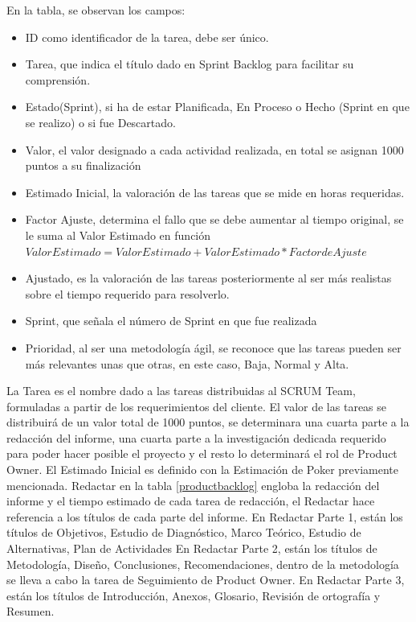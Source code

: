 En la tabla, se observan los campos:
\begin{itemize}
	\item ID como identificador de la tarea, debe ser único.
	\item Tarea, que indica el título dado en Sprint Backlog para facilitar su comprensión.
	\item Estado(Sprint), si ha de estar Planificada, En Proceso o Hecho (Sprint en que se realizo) o si fue Descartado.
	\item Valor, el valor designado a cada actividad realizada, en total se asignan 1000 puntos a su finalización
	\item Estimado Inicial, la valoración de las tareas que se mide en horas requeridas.
	\item Factor Ajuste, determina el fallo que se debe aumentar al tiempo original, se le suma al Valor Estimado en función $Valor Estimado = Valor Estimado + Valor Estimado * Factor de Ajuste$
	\item Ajustado, es la valoración de las tareas posteriormente al ser más realistas sobre el tiempo requerido para resolverlo.
	\item Sprint, que señala el número de Sprint en que fue realizada
	\item  Prioridad, al ser una metodología ágil, se reconoce que las tareas pueden ser más relevantes unas que otras, en este caso, Baja, Normal y Alta.

\end{itemize}
La Tarea es el nombre dado a las tareas distribuidas al SCRUM Team, formuladas a partir de los requerimientos del cliente.
El valor de las tareas se distribuirá de un valor total de 1000 puntos, se determinara una cuarta parte a la redacción del informe, una cuarta parte a la investigación dedicada requerido para poder hacer posible el proyecto y el resto lo determinará el rol de Product Owner.
El Estimado Inicial es definido con la Estimación de Poker previamente mencionada.
Redactar en la tabla \ref{productbacklog} engloba la redacción del informe y el tiempo estimado de cada tarea de redacción, el Redactar hace referencia a los títulos de cada parte del informe.
En Redactar Parte 1, están los títulos de Objetivos, Estudio de Diagnóstico, Marco Teórico, Estudio de Alternativas, Plan de Actividades
En Redactar Parte 2, están los títulos de Metodología, Diseño, Conclusiones, Recomendaciones, dentro de la metodología se lleva a cabo la tarea de Seguimiento de Product Owner.
En Redactar Parte 3, están los títulos de Introducción, Anexos, Glosario, Revisión de ortografía y Resumen.
